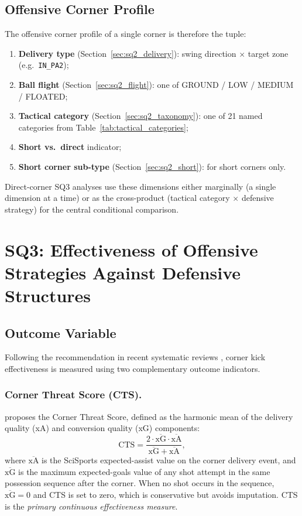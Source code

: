 \subsection{Offensive Corner Profile}
\label{sec:sq2_profile}

The offensive corner profile of a single corner is therefore the tuple:
\begin{enumerate}
  \item \textbf{Delivery type} (Section~\ref{sec:sq2_delivery}): swing
        direction $\times$ target zone (e.g.\ \texttt{IN\_PA2});
  \item \textbf{Ball flight} (Section~\ref{sec:sq2_flight}): one of GROUND /
        LOW / MEDIUM / FLOATED;
  \item \textbf{Tactical category} (Section~\ref{sec:sq2_taxonomy}): one of
        21 named categories from Table~\ref{tab:tactical_categories};
  \item \textbf{Short vs.\ direct} indicator;
  \item \textbf{Short corner sub-type} (Section~\ref{sec:sq2_short}): for
        short corners only.
\end{enumerate}
Direct-corner SQ3 analyses use these dimensions either marginally (a single
dimension at a time) or as the cross-product (tactical category $\times$
defensive strategy) for the central conditional comparison.

\section{SQ3: Effectiveness of Offensive Strategies Against Defensive Structures}
\label{sec:sq3}

\subsection{Outcome Variable}
\label{sec:sq3_outcome}

Following the recommendation in recent systematic reviews
\citep[e.g.][]{Plakias2025, Casal2015}, corner kick effectiveness is
measured using two complementary outcome indicators.

\subsubsection{Corner Threat Score (CTS).}
\citet{Lamberts2023} proposes the Corner Threat Score, defined as the harmonic
mean of the delivery quality (xA) and conversion quality (xG) components:
\begin{equation}
  \mathrm{CTS} = \frac{2 \cdot \overline{\mathrm{xG}} \cdot \overline{\mathrm{xA}}}
                       {\overline{\mathrm{xG}} + \overline{\mathrm{xA}}},
  \label{eq:cts}
\end{equation}
where $\overline{\mathrm{xA}}$ is the SciSports expected-assist value on the
corner delivery event, and $\overline{\mathrm{xG}}$ is the maximum expected-goals
value of any shot attempt in the same possession sequence after the corner.
When no shot occurs in the sequence, $\overline{\mathrm{xG}} = 0$ and CTS is
set to zero, which is conservative but avoids imputation.
CTS is the \textit{primary continuous effectiveness measure}.

